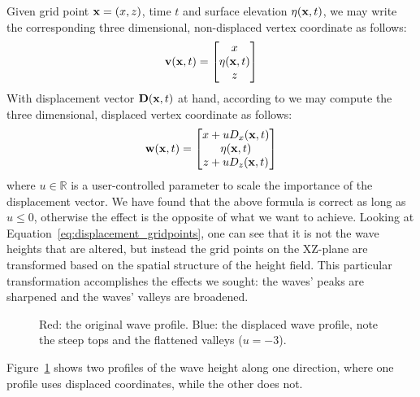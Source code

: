 Given grid point $\mathbf{x} = (x,z)$, time $t$ and surface elevation $\eta(\mathbf{x},t)$, 
we may write the corresponding three dimensional, non-displaced vertex 
coordinate as follows:
\begin{equation*}
 \mathbf{v}(\mathbf{x},t) = \begin{bmatrix}x\\ \eta(\mathbf{x},t)\\ z\end{bmatrix} 
\end{equation*}
With displacement vector $\mathbf{D}(\mathbf{x},t)$ at hand, according to 
\citet{course:simulatingocean} we may compute the three dimensional,
displaced vertex coordinate as follows:
\begin{equation}
\label{eq:displacement_gridpoints}
 \mathbf{w}(\mathbf{x},t) =
 \begin{bmatrix}
  x + u D_x(\mathbf{x},t)\\ 
  \eta(\mathbf{x},t)\\
  z + u D_z(\mathbf{x},t)
 \end{bmatrix}
\end{equation}
where $u\in\mathbb{R}$ is a user-controlled parameter to scale the importance of the
displacement vector. We have found that the above formula is correct as long as
$u \leq 0$, otherwise the effect is the opposite of what we want to achieve.
Looking at Equation~\ref{eq:displacement_gridpoints},
one can see that it is not the wave heights that are altered, but instead the grid
points on the XZ-plane are transformed based on the spatial structure of the
height field. This particular transformation accomplishes the effects we sought:
the waves' peaks are sharpened and the waves' valleys are broadened.
%
\begin{figure}
\centering
{}
\caption{Red: the original wave profile. Blue: the displaced wave profile, note 
the steep tops and the flattened valleys ($u = -3$).}
\label{fig:grid_displaced}
\end{figure}
%
Figure~\ref{fig:grid_displaced} shows two profiles of the wave height along one 
direction, where one profile uses displaced coordinates, while the other does 
not.
%
